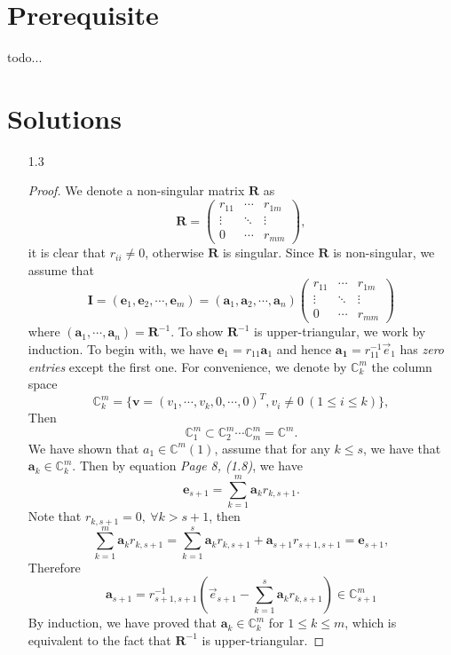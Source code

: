 \section{Prerequisite}
todo...

\section{Solutions}
\begin{enumerate}
    \item [1.3] {
    \begin{proof}
    We denote a non-singular matrix $\bm{R}$ as
    $$
    \bm{R} = \left(\begin{array}{ccc}
         r_{11} & \cdots & r_{1m}  \\
         \vdots & \ddots & \vdots \\
         0 & \cdots & r_{mm}
    \end{array}\right),
    $$
    it is clear that $r_{ii} \neq 0$, otherwise $\bm{R}$ is singular. Since $\bm{R}$ is non-singular, we assume that
    \[ \bm{I} = (\bm{e}_1, \bm{e}_2, \cdots, \bm{e}_{m}) = (\bm{a}_1, \bm{a}_2, \cdots, \bm{a}_n)\left(\begin{array}{ccc}
         r_{11} & \cdots & r_{1m}  \\
         \vdots & \ddots & \vdots \\
         0 & \cdots & r_{mm}
    \end{array}\right)
    \]
    where $(\bm{a}_1, \cdots, \bm{a}_n) = \bm{R}^{-1}$. To show $\bm{R}^{-1}$ is upper-triangular, we work by induction. To begin with, we have $\bm{e}_1 = r_{11} \bm{a}_1$ and hence $\bm{a_1} = r_{11}^{-1} \vec{e}_1$ has \textit{zero entries} except the first one. For convenience, we denote by $\mathbb{C}^{m}_{k}$ the column space
    \[ \mathbb{C}_{k}^{m} = \{ \bm{v} = (v_1, \cdots, v_{k}, 0,\cdots, 0)^{T}, v_{i} \neq 0 ~(1\leq i \leq k)\}, \]
    Then
    \[ \mathbb{C}^{m}_1 \subset \mathbb{C}^{m}_{2} \cdots \mathbb{C}^{m}_{m}  = \mathbb{C}^{m}. \]
    We have shown that $a_1 \in \mathbb{C}^{m}(1)$, assume that for any $k \leq s$, we have that $\mathbf{a}_k \in \mathbb{C}^{m}_{k}$. Then by equation \textit{Page 8, (1.8)}, we have
    \[\bm{e}_{s+1} = \sum_{k=1}^{m} \bm{a}_k r_{k,s+1}.\]
    Note that $r_{k,s+1} = 0, ~\forall k > s+1$, then
    \[ \sum_{k=1}^{m} \bm{a}_k r_{k, s+1} = \sum_{k = 1}^{s} \bm{a}_k r_{k, s+1} + \bm{a}_{s+1} r_{s+1, s+1} = \bm{e}_{s+1},\]
    Therefore
    \[ \bm{a}_{s+1} = r_{s+1,s+1}^{-1} (\vec{e}_{s+1} - \sum_{k=1}^{s} \bm{a}_{k} r_{k,s+1}) \in \mathbb{C}^{m}_{s+1}\]
    By induction, we have proved that $\bm{a}_{k} \in \mathbb{C}^{m}_{k}$ for $1 \leq k \leq m$, which is equivalent to the fact that $\bm{R}^{-1}$ is upper-triangular.
    \end{proof}
    }
    

\end{enumerate}
